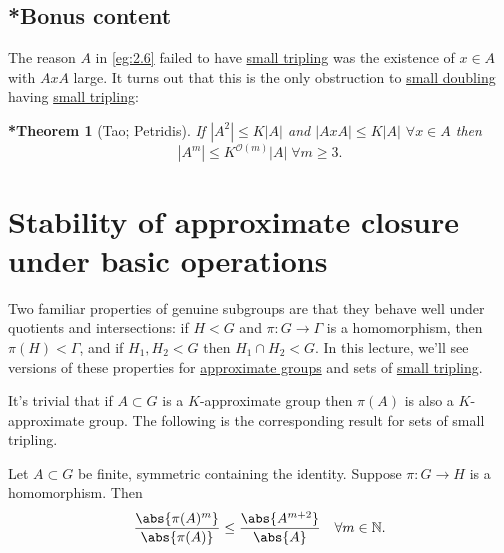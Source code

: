 \documentclass{article}
\newtheorem{nthm*}[nthm]{*Theorem}
\newcommand{\ratio}[2]{\frac{\abs{#1}}{\abs{#2}}}
\numberwithin{equation}{section}
\begin{document}
\color{gray}
\subsection*{*Bonus content}
The reason $A$ in \cref{eg:2.6} failed to have \hyperlink{def:tripling}{small tripling} was the existence of $x \in A$ with $A x A$ large.
It turns out that this is the only obstruction to \hyperlink{def:doubling}{small doubling} having \hyperlink{def:tripling}{small tripling}:
\begin{nthm*}[Tao; Petridis]\label{thm:3.5}
  If $|A^2| \leq K|A|$ and $|AxA| \leq K|A|$ $\forall x \in A$ then
  \begin{equation*}|A^m| \leq K^{\mathcal{O}(m)} |A| \; \forall m \geq 3.\end{equation*}
\end{nthm*}
\color{black}

\clearpage
\section{Stability of approximate closure under basic operations}
\newlec
Two familiar properties of genuine subgroups are that they behave well under quotients and intersections:
if $H < G$ and $\pi: G \to \Gamma$ is a homomorphism, then $\pi(H) < \Gamma$, and if $H_1, H_2 < G$ then $H_1 \cap H_2 < G$.
In this lecture, we'll see versions of these properties for \hyperlink{def:appGroup}{approximate groups} and sets of \hyperlink{def:tripling}{small tripling}.

It's trivial that if $A \subset G$ is a $K$-approximate group then $\pi(A)$ is also a $K$-approximate group.
The following is the corresponding result for sets of small tripling.
\begin{nlemma}\label{lem:4.1}
  Let $A \subset G$ be finite, symmetric containing the identity. Suppose $\pi: G \to H$ is a homomorphism. Then
  \begin{equation*}
    \ratio{\pi(A)^m}{\pi(A)} \leq \ratio{A^{m+2}}{A} \quad \forall m \in \mathbb{N}.
  \end{equation*}
\end{nlemma}
\end{document}
